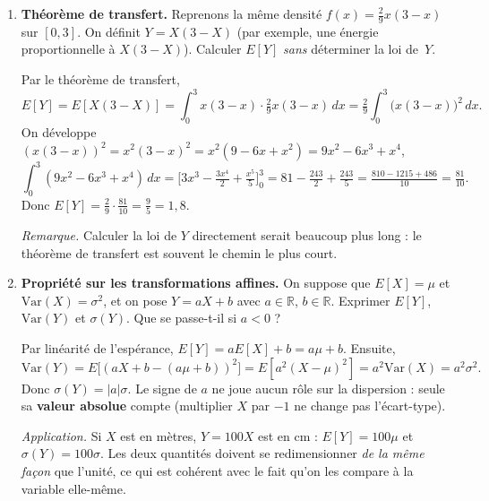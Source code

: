 \begin{enumerate}
\begin{solution}
    Pour la densité constante sur $[0,3]$ :
    $\text{Var}=\frac{3^2}{12}=0{,}75$.

    \textit{Commentaire.} La densité parabolique est plus
    \og concentrée \fg{} autour de $3/2$ que la densité
    constante : cela se traduit par une variance plus petite
    ($0{,}45<0{,}75$).
  \end{solution}

  \item \textbf{Théorème de transfert.}
  Reprenons la même densité $f(x)=\tfrac{2}{9}x(3-x)$ sur $[0,3]$.
  On définit $Y=X(3-X)$ (par exemple, une énergie proportionnelle
  à $X(3-X)$).
  Calculer $E[Y]$ \emph{sans} déterminer la loi de~$Y$.
  \begin{solution}
    Par le théorème de transfert,
    \[
      E[Y]=E[X(3-X)]=\int_0^3 x(3-x)\cdot\tfrac{2}{9}x(3-x)\,dx
      =\tfrac{2}{9}\int_0^3 \bigl(x(3-x)\bigr)^2\,dx.
    \]
    On développe $(x(3-x))^2=x^2(3-x)^2=x^2(9-6x+x^2)=9x^2-6x^3+x^4$,
    \[
      \int_0^3(9x^2-6x^3+x^4)\,dx
      =\bigl[3x^3-\tfrac{3x^4}{2}+\tfrac{x^5}{5}\bigr]_0^3
      =81-\tfrac{243}{2}+\tfrac{243}{5}
      =\tfrac{810-1215+486}{10}=\tfrac{81}{10}.
    \]
    Donc $E[Y]=\tfrac{2}{9}\cdot\tfrac{81}{10}=\tfrac{9}{5}=1{,}8$.

    \textit{Remarque.} Calculer la loi de $Y$ directement
    serait beaucoup plus long : le théorème de transfert
    est souvent le chemin le plus court.
  \end{solution}

  \item \textbf{Propriété sur les transformations affines.}
  On suppose que $E[X]=\mu$ et $\text{Var}(X)=\sigma^2$,
  et on pose $Y=aX+b$ avec $a\in\mathbb R$, $b\in\mathbb R$.
  Exprimer $E[Y]$, $\text{Var}(Y)$ et $\sigma(Y)$.
  Que se passe-t-il si $a<0$ ?
  \begin{solution}
    Par linéarité de l'espérance, $E[Y]=aE[X]+b=a\mu+b$. Ensuite,
    \[
      \text{Var}(Y)=E\bigl[(aX+b-(a\mu+b))^2\bigr]
      =E[a^2(X-\mu)^2]=a^2\text{Var}(X)=a^2\sigma^2.
    \]
    Donc $\sigma(Y)=|a|\sigma$.
    Le signe de $a$ ne joue aucun rôle sur la dispersion :
    seule sa \textbf{valeur absolue} compte (multiplier $X$ par $-1$
    ne change pas l'écart-type).

    \textit{Application.} Si $X$ est en mètres, $Y=100X$ est en cm :
    $E[Y]=100\mu$ et $\sigma(Y)=100\sigma$. Les deux quantités
    doivent se redimensionner \emph{de la même façon} que l'unité,
    ce qui est cohérent avec le fait qu'on les compare à la variable
    elle-même.
  \end{solution}
\end{enumerate}
\newpage


